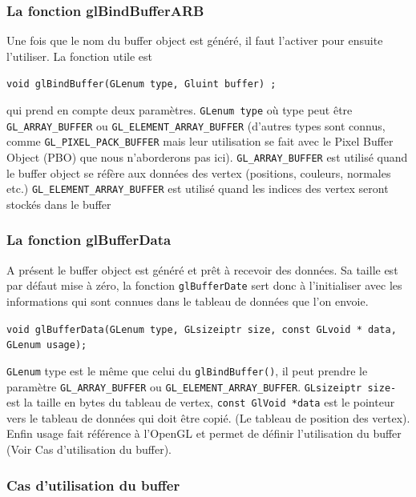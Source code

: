 \subsubsection*{La fonction glBindBufferARB}

Une fois que le nom du buffer object est généré, il faut l’activer pour ensuite l’utiliser. La fonction utile est 
\begin{center}
\verb|void glBindBuffer(GLenum type, Gluint buffer) ;|
\end{center}
qui prend en compte deux paramètres. \verb|GLenum type| où type peut être \verb|GL_ARRAY_BUFFER| ou \verb|GL_ELEMENT_ARRAY_BUFFER| (d’autres types sont connus, comme \verb|GL_PIXEL_PACK_BUFFER| mais leur utilisation se fait avec le Pixel Buffer Object (PBO) que nous n’aborderons pas ici). \verb|GL_ARRAY_BUFFER| est utilisé quand le buffer object se réfère aux données des vertex (positions, couleurs, normales etc.) \verb|GL_ELEMENT_ARRAY_BUFFER| est utilisé quand les indices des vertex seront stockés dans le buffer

\subsubsection*{La fonction glBufferData}

A présent le buffer object est généré et prêt à recevoir des données. Sa taille est par défaut mise à zéro, la fonction \verb|glBufferDate| sert donc à l’initialiser avec les informations qui sont connues dans le tableau de données que l’on envoie.
\begin{center}
\verb|void glBufferData(GLenum type, GLsizeiptr size, const GLvoid * data, |\\
\verb|GLenum usage);|
\end{center}
\verb|GLenum| type est le même que celui du \verb|glBindBuffer()|, il peut prendre le paramètre \verb|GL_ARRAY_BUFFER| ou \verb|GL_ELEMENT_ARRAY_BUFFER|. \verb|GLsizeiptr size-| est la taille en bytes du tableau de vertex, \verb|const GlVoid *data| est le pointeur vers le tableau de données qui doit être copié. (Le tableau de position des vertex). Enfin usage fait référence à l’OpenGL et permet de définir l’utilisation du buffer (Voir Cas d’utilisation du buffer).
\subsubsection{Cas d'utilisation du buffer}

